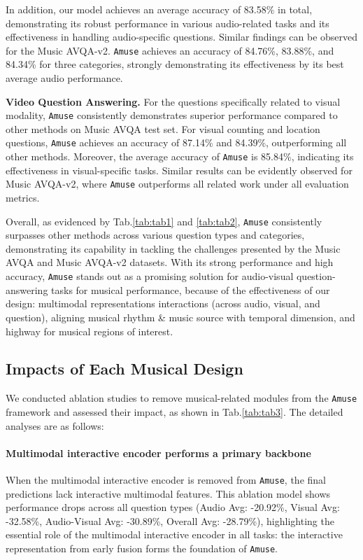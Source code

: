 \documentclass[11pt]{article}
\begin{document}
In addition, our model achieves an average accuracy of 83.58\% in total, demonstrating its robust performance in various audio-related tasks and its effectiveness in handling audio-specific questions. Similar findings can be observed for the Music AVQA-v2. \texttt{Amuse} achieves an accuracy of 84.76\%, 83.88\%, and 84.34\% for three categories, strongly demonstrating its effectiveness by its best average audio performance. 


\textbf{Video Question Answering.} For the questions specifically related to visual modality, \texttt{Amuse} consistently demonstrates superior performance compared to other methods on Music AVQA test set. For visual counting and location questions, \texttt{Amuse} achieves an accuracy of 87.14\% and 84.39\%, outperforming all other methods. Moreover, the average accuracy of \texttt{Amuse} is 85.84\%, indicating its effectiveness in visual-specific tasks. Similar results can be evidently observed for Music AVQA-v2, where \texttt{Amuse} outperforms all related work under all evaluation metrics. 

Overall, as evidenced by Tab.\ref{tab:tab1} and \ref{tab:tab2}, \texttt{Amuse} consistently surpasses other methods across various question types and categories, demonstrating its capability in tackling the challenges presented by the Music AVQA and Music AVQA-v2 datasets. With its strong performance and high accuracy, \texttt{Amuse} stands out as a promising solution for audio-visual question-answering tasks for musical performance, because of the effectiveness of our design: multimodal representations interactions (across audio, visual, and question),  aligning musical rhythm \& music source with temporal dimension, and highway for musical regions of interest. 
\subsection{Impacts of Each Musical Design}
\label{subsec:exp-5}

We conducted ablation studies to remove musical-related modules from the \texttt{Amuse} framework and assessed their impact, as shown in Tab.\ref{tab:tab3}. The detailed analyses are as follows:

\paragraph{Multimodal interactive encoder performs a primary backbone} When the multimodal interactive encoder is removed from \texttt{Amuse}, the final predictions lack interactive multimodal features. This ablation model shows performance drops across all question types (Audio Avg: -20.92\%, Visual Avg: -32.58\%, Audio-Visual Avg: -30.89\%, Overall Avg: -28.79\%), highlighting the essential role of the multimodal interactive encoder in all tasks: the interactive representation from early fusion forms the foundation of \texttt{Amuse}.
\end{document}
